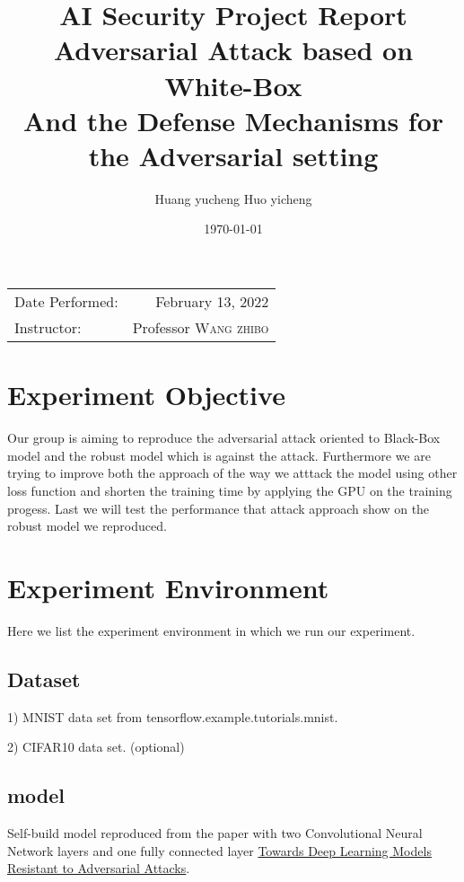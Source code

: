 \documentclass[
	letterpaper, %
	10pt, %
]{CSUniSchoolLabReport}
\title{AI Security Project Report \\ Adversarial Attack based on White-Box \\ And the Defense Mechanisms for the Adversarial setting} %
\author{Huang yucheng Huo yicheng} %
\date{\today} %
\begin{document}
\maketitle %

\begin{center}
	\begin{tabular}{l r}
		Date Performed: & February 13, 2022 \\ %
		Instructor: & Professor \textsc{Wang zhibo} %
	\end{tabular}
\end{center}



\section{Experiment Objective}

Our group is aiming to reproduce the adversarial attack oriented to Black-Box model and the robust model which is against the attack. Furthermore we are trying to improve both the approach of the way we atttack the model using other loss function and shorten the training time by applying the GPU on the training progess. Last we will test the performance that attack approach show on the robust model we reproduced. 

\section{Experiment Environment}
Here we list the experiment environment in which we run our experiment.
\subsection{Dataset}
1) MNIST data set from tensorflow.example.tutorials.mnist.

2) CIFAR10 data set. (optional)
\subsection{model}
Self-build model reproduced from the paper with two Convolutional Neural Network layers and one fully connected layer \href{https://arxiv.org/pdf/1706.06083.pdf}{Towards Deep Learning Models Resistant to Adversarial	Attacks}.
\end{document}
